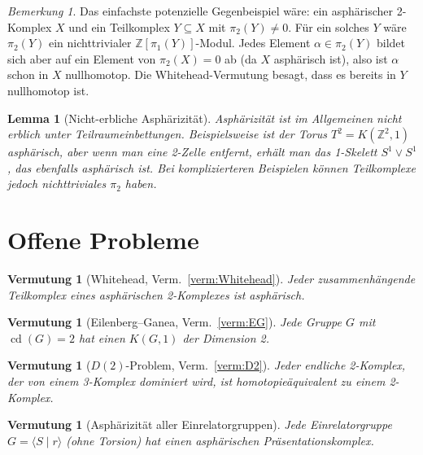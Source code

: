 \documentclass[12pt,a4paper]{amsart}
\newtheorem{lemma}[theorem]{Lemma}
\newtheorem{vermutung}[theorem]{Vermutung}
\theoremstyle{definition}
\theoremstyle{remark}
\newtheorem{bemerkung}[theorem]{Bemerkung}
\newcommand{\Z}{\mathbb{Z}}
\DeclareMathOperator{\cd}{cd}
\begin{document}
\begin{bemerkung}
Das einfachste potenzielle Gegenbeispiel wäre: ein asphärischer 2-Komplex $X$
und ein Teilkomplex $Y \subseteq X$ mit $\pi_2(Y) \neq 0$. Für ein solches
$Y$ wäre $\pi_2(Y)$ ein nichttrivialer $\Z[\pi_1(Y)]$-Modul. Jedes
Element $\alpha \in \pi_2(Y)$ bildet sich aber auf ein Element von
$\pi_2(X) = 0$ ab (da $X$ asphärisch ist), also ist $\alpha$ schon
in $X$ nullhomotop. Die Whitehead-Vermutung besagt, dass es bereits
in $Y$ nullhomotop ist.
\end{bemerkung}

\begin{lemma}[Nicht-erbliche Asphärizität]
Asphärizität ist im Allgemeinen nicht erblich unter Teilraumeinbettungen.
Beispielsweise ist der Torus $T^2 = K(\Z^2, 1)$ asphärisch, aber wenn
man eine 2-Zelle entfernt, erhält man das 1-Skelett $S^1 \vee S^1$,
das ebenfalls asphärisch ist. Bei komplizierteren Beispielen können
Teilkomplexe jedoch nichttriviales $\pi_2$ haben.
\end{lemma}

\section{Offene Probleme}

\begin{vermutung}[Whitehead, Verm.~\ref{verm:Whitehead}]
Jeder zusammenhängende Teilkomplex eines asphärischen 2-Komplexes
ist asphärisch.
\end{vermutung}

\begin{vermutung}[Eilenberg--Ganea, Verm.~\ref{verm:EG}]
Jede Gruppe $G$ mit $\cd(G) = 2$ hat einen $K(G,1)$ der Dimension 2.
\end{vermutung}

\begin{vermutung}[$D(2)$-Problem, Verm.~\ref{verm:D2}]
Jeder endliche 2-Komplex, der von einem 3-Komplex dominiert wird,
ist homotopieäquivalent zu einem 2-Komplex.
\end{vermutung}

\begin{vermutung}[Asphärizität aller Einrelatorgruppen]
\label{verm:einrelator-asph}
Jede Einrelatorgruppe $G = \langle S \mid r \rangle$ (ohne Torsion)
hat einen asphärischen Präsentationskomplex.
\end{vermutung}
\end{document}
